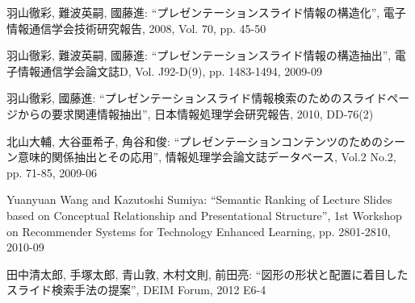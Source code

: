 \documentclass{js}
\begin{document}
\begin{thebibliography}{99}


羽山徹彩, 難波英嗣, 國藤進:
``プレゼンテーションスライド情報の構造化'',
電子情報通信学会技術研究報告, 2008, Vol. 70, pp. 45-50

羽山徹彩, 難波英嗣, 國藤進:
``プレゼンテーションスライド情報の構造抽出'', 
電子情報通信学会論文誌D, Vol. J92-D(9), pp. 1483-1494, 2009-09

羽山徹彩, 國藤進: 
``プレゼンテーションスライド情報検索のためのスライドページからの要求関連情報抽出'',
日本情報処理学会研究報告, 2010, DD-76(2)

北山大輔, 大谷亜希子, 角谷和俊: 
``プレゼンテーションコンテンツのためのシーン意味的関係抽出とその応用'', 
 情報処理学会論文誌データベース, Vol.2 No.2, pp. 71-85, 2009-06


Yuanyuan Wang and Kazutoshi Sumiya: 
``Semantic Ranking of Lecture Slides based on Conceptual Relationship and Presentational Structure'',
1st Workshop on Recommender Systems for Technology Enhanced Learning, pp. 2801-2810, 2010-09



田中清太郎, 手塚太郎, 青山敦, 木村文則, 前田亮: 
``図形の形状と配置に着目したスライド検索手法の提案'',
DEIM Forum, 2012 E6-4




\end{thebibliography}
\end{document}
